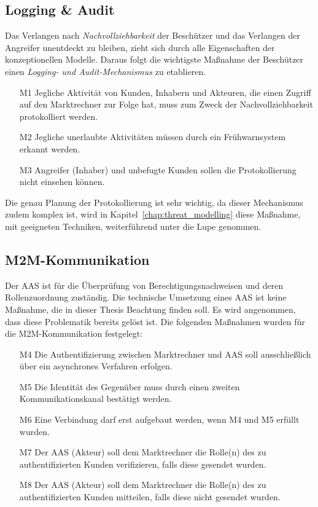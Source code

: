 \documentclass[11pt,a4paper]{report}
\begin{document}
\subsection{Logging \& Audit}
Das Verlangen nach \textit{Nachvollziehbarkeit} der Beschützer und das Verlangen der Angreifer unentdeckt zu bleiben, zieht sich durch alle Eigenschaften der konzeptionellen Modelle. Daraus folgt die wichtigste Maßnahme der Beschützer einen \textit{Logging- und Audit-Mechanismus} zu etablieren.

\begin{enumerate}
\item[M1] Jegliche Aktivität von Kunden, Inhabern und Akteuren, die einen Zugriff auf den Marktrechner zur Folge hat, muss zum Zweck der Nachvollziehbarkeit protokolliert werden.
\item[M2] Jegliche unerlaubte Aktivitäten müssen durch ein Frühwarnsystem erkannt werden.
\item[M3] Angreifer (Inhaber) und unbefugte Kunden sollen die Protokollierung nicht einsehen können.
\end{enumerate}

Die genau Planung der Protokollierung ist sehr wichtig, da dieser Mechanismus zudem komplex ist, wird in Kapitel~\ref{chap:threat_modelling} diese Maßnahme, mit geeigneten Techniken, weiterführend unter die Lupe genommen.

\subsection{M2M-Kommunikation} \label{m2m_comm} 
Der AAS ist für die Überprüfung von Berechtigungsnachweisen und deren Rollenzuordnung zuständig. Die technische Umsetzung eines AAS ist keine Maßnahme, die in dieser Thesis Beachtung finden soll. Es wird angenommen, dass diese Problematik bereits gelöst ist. Die folgenden Maßnahmen wurden für die M2M-Kommunikation festgelegt:

\begin{enumerate}
\item[M4] Die Authentifizierung zwischen Marktrechner und AAS soll ausschließlich über ein asynchrones Verfahren erfolgen.
\item[M5] Die Identität des Gegenüber muss durch einen zweiten Kommunikationskanal bestätigt werden.
\item[M6] Eine Verbindung darf erst aufgebaut werden, wenn M4 und M5 erfüllt wurden.
\item[M7] Der AAS (Akteur) soll dem Marktrechner die Rolle(n) des zu authentifizierten Kunden verifizieren, falls diese gesendet wurden.
\item[M8] Der AAS (Akteur) soll dem Marktrechner die Rolle(n) des zu authentifizierten Kunden mitteilen, falls diese nicht gesendet wurden.
\end{enumerate}
\end{document}
